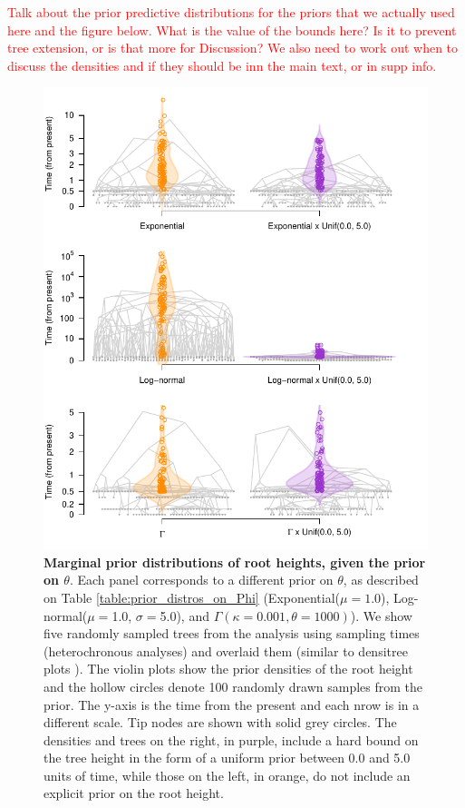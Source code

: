 \documentclass[10pt,letterpaper]{article}
\begin{document}
\textcolor{red}{Talk about the prior predictive distributions for the priors that we actually used here and the figure below. What is the value of the bounds here? Is it to prevent tree extension, or is that more for Discussion? We also need to work out when to discuss the densities and if they should be inn the main text, or in supp info.}

\begin{figure}[!h]
	\begin{center}
		\includegraphics[width=14cm]{sandbox_figures/prior_tree_distros.pdf}\newline
		\vspace{-0.5cm}
		\caption{\textbf{Marginal prior distributions of root heights, given the prior on $\theta$}. Each panel corresponds to a different prior on $\theta$, as described on Table \ref{table:prior_distros_on_Phi} (Exponential($\mu=1.0$), Log-normal($\mu=$1.0, $\sigma=$5.0), and $\Gamma(\kappa=0.001, \theta=1000)$). We show five randomly sampled trees from the analysis using sampling times (heterochronous analyses) and overlaid them (similar to densitree plots \cite{bouckaert2010densitree}). The violin plots show the prior densities of the root height and the hollow circles denote 100 randomly drawn samples from the prior. The y-axis is the time from the present and each nrow is in a different scale. Tip nodes are shown with solid grey circles. The densities and trees on the right, in purple, include a hard bound on the tree height in the form of a uniform prior between 0.0 and 5.0 units of time, while those on the left, in orange, do not include an explicit prior on the root height.}
		\label{figure:prior_tree_distros}
	\end{center}
\end{figure}
\end{document}
